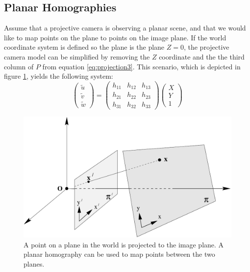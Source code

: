 \subsection{Planar Homographies}\label{planar-homographies}
Assume that a projective camera is observing a planar scene, and that we would like to map points on the plane to points on the image plane. 
If the world coordinate system is defined so the plane is the plane $Z=0$, the projective camera model can be simplified by removing the $Z$ coordinate and the the third column of $P$ from equation \ref{eq:projection3}. 
This scenario, which is depicted in figure \ref{fig:planar_homography}, yields the following system:
\begin{equation}\label{eq:homography}
\begin{pmatrix} \tilde{u} \\ \tilde{v} \\ \tilde{w} \end{pmatrix} =
\begin{pmatrix} h_{11} & h_{12} & h_{13}  \\
 				h_{21} & h_{22} & h_{23}  \\
				h_{31} & h_{32} & h_{33}\end{pmatrix}
\begin{pmatrix}X \\Y \\ 1\end{pmatrix}
\end{equation}

\begin{figure}
\begin{center}
\includegraphics[width=1.0\textwidth]{figures/planar_homography.pdf}
\end{center}
\caption{A point on a plane in the world is projected to the image plane. A planar homography can be used to map points between the two planes.} %
\label{fig:planar_homography}
\end{figure}

